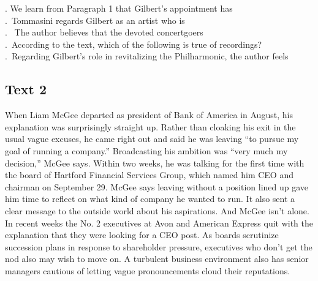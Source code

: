  \begin{questions} . We learn from Paragraph 1 that Gilbert’s appointment has
 \\ . Tommasini regards Gilbert as an artist who is
 \\ .  The author believes that the devoted concertgoers
 \\ . According to the text, which of the following is true of recordings?
 \\ . Regarding Gilbert’s role in revitalizing the Philharmonic, the author feels
 \\ \end{questions}      \subsection{Text 2}
 When Liam McGee departed as president of Bank of America in August, his explanation was surprisingly straight up. Rather than cloaking his exit in the usual vague excuses, he came right out and said he was leaving “to pursue my goal of running a company.” Broadcasting his ambition was “very much my decision,” McGee says. Within two weeks, he was talking for the first time with the board of Hartford Financial Services Group, which named him CEO and chairman on September 29.
 McGee says leaving without a position lined up gave him time to reflect on what kind of company he wanted to run. It also sent a clear message to the outside world about his aspirations. And McGee isn’t alone. In recent weeks the No. 2 executives at Avon and American Express quit with the explanation that they were looking for a CEO post. As boards scrutinize succession plans in response to shareholder pressure, executives who don’t get the nod also may wish to move on. A turbulent business environment also has senior managers cautious of letting vague pronouncements cloud their reputations.
